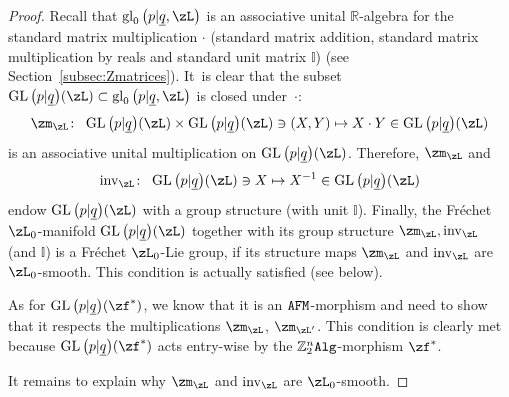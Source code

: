 \documentclass[10pt,a4paper]{amsart}
\newcommand{\op}[1]{\operatorname{#1}}
\newcommand{\R}{{\mathbb R}}
\newcommand{\Z}{{\mathbb Z}}
\def\ul{\underline}
\def\ul{\underline}
\newcommand{\0}{\otimes}
\newcommand{\z}{\Z_2^n}
\numberwithin{equation}{section}
\begin{document}
\begin{proof}
Recall that $\op{gl}_0\big(p|\ul q,\zL\big)$ is an associative unital $\R$-algebra for the standard matrix multiplication $\cdot$ (standard matrix addition, standard matrix multiplication by reals and standard unit matrix $\mathbb{I}$) (see Section~\ref{subsec:Zmatrices}). It~is clear that the subset $\op{GL}\big(p|\ul q\big)(\zL)\subset\op{gl}_0\big(p|\ul q,\zL\big)$ is closed under~$\cdot$:
\begin{gather}\label{MultGL}
\zm_\zL\colon\ \op{GL}\big(p|\ul q\big)(\zL)\times\op{GL}\big(p|\ul q\big)(\zL)\ni(X,Y)\mapsto X\cdot Y\in\op{GL}\big(p|\ul q\big)(\zL)
\end{gather}
is an associative unital multiplication on $\op{GL}\big(p|\ul q\big)(\zL)$. Therefore, $\zm_\zL$ and
\begin{gather}\label{InvGL}
\op{inv}_\zL\colon\ \op{GL}\big(p|\ul q\big)(\zL)\ni X\mapsto X^{-1}\in \op{GL}\big(p|\ul q\big)(\zL)
\end{gather}
endow $\op{GL}\big(p|\ul q\big)(\zL)$ with a group structure (with unit $\mathbb{I}$). Finally, the Fr\'echet $\zL_0$-manifold $\mathop{\rm GL}\big(p|\ul q\big)(\zL)$ together with its group structure $\zm_\zL,\op{inv}_\zL$ (and $\mathbb{I}$) is a Fr\'echet $\zL_0$-Lie group, if its structure maps $\zm_\zL$ and $\op{inv}_\zL$ are $\zL_0$-smooth. This condition is actually satisfied (see below).

As for $\op{GL}\big(p|\ul q\big)(\zf^*)$, we know that it is an ${\tt AFM}$-morphism and need to show that it respects the multiplications $\zm_\zL$, $\zm_{\zL'}$. This condition is clearly met because $\op{GL}\big(p|\ul q\big)(\zf^*)$ acts entry-wise by the $\z{\tt Alg}$-morphism $\zf^*$.

It remains to explain why $\zm_\zL$ and $\op{inv}_\zL$ are $\zL_0$-smooth.


\end{proof}
\end{document}
